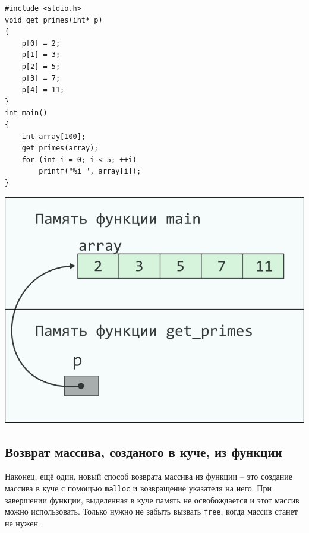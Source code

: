 \documentclass[10pt]{article}
\begin{document}
\noindent\begin{minipage}{.45\textwidth}
\begin{lstlisting}
#include <stdio.h>
void get_primes(int* p) 
{
    p[0] = 2;
    p[1] = 3;
    p[2] = 5;
    p[3] = 7;
    p[4] = 11;	
}
int main() 
{
    int array[100];
    get_primes(array);
    for (int i = 0; i < 5; ++i)
        printf("%i ", array[i]);
}
\end{lstlisting}
\end{minipage}
\begin{minipage}{.45\textwidth}
\includegraphics[scale=0.9]{../images/pointer_schemes/function_return_arg_array.png}
\end{minipage}
\newpage
\subsection*{Возврат массива, созданого в куче, из функции}

Наконец, ещё один, новый способ возврата массива из функции -- это создание
массива в куче с помощью \texttt{malloc} и возвращение указателя на него.
При завершении функции, выделенная в куче память не освобождается и этот массив
можно использовать. Только нужно не забыть вызвать \texttt{free}, когда 
массив станет не нужен.
\end{document}
